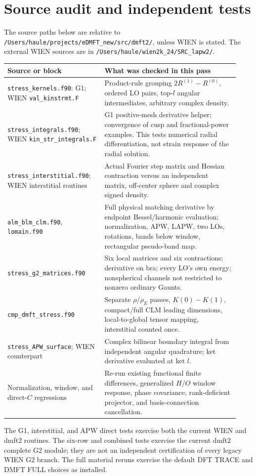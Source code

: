 \documentclass[11pt]{article}
\begin{document}
\section{Source audit and independent tests}
The source paths below are relative to \nolinkurl{/Users/haule/projects/eDMFT_new/src/dmft2/}, unless WIEN is stated. The external WIEN sources are in \nolinkurl{/Users/haule/wien2k_24/SRC_lapw2/}.
\begin{longtable}{>{\raggedright\arraybackslash}p{0.39\linewidth}>{\raggedright\arraybackslash}p{0.54\linewidth}}
\toprule
Source or block & What was checked in this pass\\\midrule
\texttt{stress\_kernels.f90}: G1; WIEN \texttt{val\_kinstrmt.F} & Product-rule grouping $2R^{(1)}-R^{(0)}$, ordered LO pairs, top-$l$ angular intermediates, arbitrary complex density.\\
\texttt{stress\_integrals.f90}; WIEN \texttt{kin\_str\_integrals.F} & G1 positive-mesh derivative helper; convergence of cusp and fractional-power examples. This tests numerical radial differentiation, not strain response of the radial solution.\\
\texttt{stress\_interstitial.f90}; WIEN interstitial routines & Actual Fourier step matrix and Hessian contraction versus an independent matrix, off-center sphere and complex signed density.\\
\texttt{alm\_blm\_clm.f90}, \texttt{lomain.f90} & Full physical matching derivative by endpoint Bessel/harmonic evaluation; normalization, APW, LAPW, two LOs, rotations, bands below window, rectangular pseudo-band map.\\
\texttt{stress\_g2\_matrices.f90} & Six local matrices and six contractions; derivative on bra; every LO's own energy; nonspherical channels not restricted to nonzero ordinary Gaunts.\\
\texttt{cmp\_dmft\_stress.f90} & Separate $\rho$/$\rho_E$ passes, $K(0)-K(1)$, compact/full CLM leading dimensions, local-to-global tensor mapping, interstitial counted once.\\
\texttt{stress\_APW\_surface}; WIEN counterpart & Complex bilinear boundary integral from independent angular quadrature; ket derivative evaluated at ket $l$.\\
Normalization, window, and direct-$C$ regressions & Re-run existing functional finite differences, generalized $H/O$ window response, phase covariance, rank-deficient projector, and basis-connection cancellation.\\\bottomrule
\end{longtable}
The G1, interstitial, and APW direct tests exercise both the current WIEN and dmft2 routines. The six-row and combined tests exercise the current dmft2 complete G2 module; they are not an independent certification of every legacy WIEN G2 branch. The full material reruns exercise the default DFT TRACE and DMFT FULL choices as installed.
\end{document}
